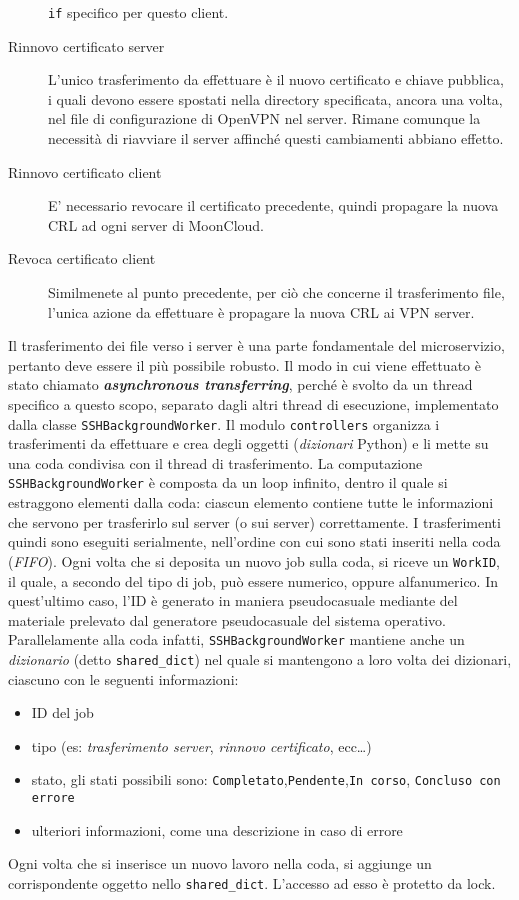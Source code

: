 \begin{description}
	\texttt{if} specifico per questo client.
	\item[Rinnovo certificato server]L'unico trasferimento da effettuare è il nuovo
	certificato e chiave pubblica, i quali devono essere spostati nella directory
	specificata, ancora una volta, nel file di configurazione di OpenVPN nel server.
	Rimane comunque la necessità di riavviare il server affinché questi cambiamenti abbiano
	effetto.
	\item[Rinnovo certificato client]E' necessario revocare il certificato precedente,
	quindi propagare la nuova CRL ad ogni server di MoonCloud.
	\item[Revoca certificato client]Similmenete al punto precedente, per ciò che concerne
	il trasferimento file, l'unica azione da effettuare è propagare la nuova
	CRL ai VPN server.
\end{description}

Il trasferimento dei file verso i server è una parte fondamentale del microservizio,
pertanto deve essere il più possibile robusto.
Il modo in cui viene effettuato è stato chiamato \textbf{\textit{asynchronous transferring}},
perché è svolto da un thread specifico a questo scopo, separato dagli altri thread di
esecuzione, implementato dalla classe \texttt{SSHBackgroundWorker}.
Il modulo \texttt{controllers} organizza i trasferimenti da effettuare e crea degli
oggetti (\textit{dizionari} Python) e li mette su una coda condivisa con il thread di
trasferimento.
La computazione \texttt{SSHBackgroundWorker} è composta da un loop infinito, dentro
il quale si estraggono elementi dalla coda: ciascun elemento contiene tutte le informazioni
che servono per trasferirlo sul server (o sui server) correttamente. I trasferimenti
quindi sono eseguiti serialmente, nell'ordine con cui sono stati inseriti
nella coda (\textit{FIFO}).
Ogni volta che si deposita un nuovo job sulla coda, si riceve un \texttt{WorkID}, il quale,
a secondo del tipo di job, può essere numerico, oppure alfanumerico. In quest'ultimo
caso, l'ID è generato in maniera pseudocasuale mediante del materiale
prelevato dal generatore pseudocasuale del sistema operativo.
Parallelamente alla coda infatti, \texttt{SSHBackgroundWorker} mantiene anche un \textit{dizionario}
(detto \texttt{shared\_dict})
nel quale si mantengono a loro volta dei dizionari, ciascuno con le seguenti informazioni:
\begin{itemize}
    \item ID del job
    \item tipo (es: \textit{trasferimento server}, \textit{rinnovo certificato}, ecc\ldots)
    \item stato, gli stati possibili sono: \texttt{Completato},\texttt{Pendente},\texttt{In corso},
    \texttt{Concluso con errore}
    \item ulteriori informazioni, come una descrizione in caso di errore
\end{itemize}
Ogni volta che si inserisce un nuovo lavoro nella coda, si aggiunge un corrispondente oggetto
nello \texttt{shared\_dict}. L'accesso ad esso è protetto da lock.

